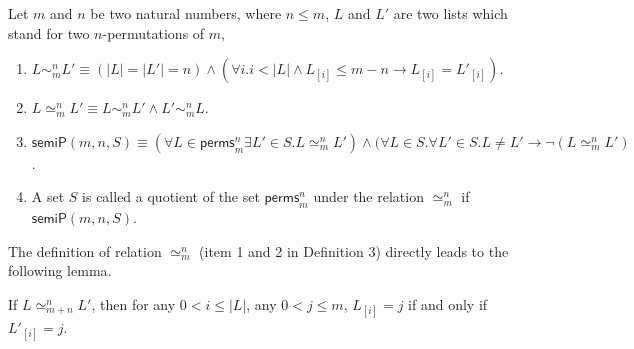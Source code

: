 \documentclass[conference]{IEEEtran}
\newcommand\cai[1]{\textcolor{blue}{ #1} }
\newcommand\caicomment[1]{\textcolor{red}{comment: #1} }
\begin{document}
\begin{definition}
Let $m$ and $n$ be two natural numbers, where $n \le m$,  $L$ and $L'$ are two lists which stand for two  $n$-permutations of $m$,
\begin{enumerate}
\item
$L \sim_m^n L' \equiv (|L| =|L'|=n) \wedge (\forall i. i<|L| \wedge L_{[i]} \le m-n \longrightarrow L_{[i]}=L'_{[i]}) $.

\item $L \simeq_m^n L' \equiv L \sim_m^n L' \wedge   L' \sim_m^n L$.


\item $\mathsf{semiP}(m,n,S)\equiv (\forall  L \in \mathsf{perms}_{m}^{n} \exists  L' \in S. L \simeq_m^n L' ) \wedge (\forall  L\in S. \forall L'\in S. L \neq L' \longrightarrow \neg  (L \simeq_m^n L' )$.

\item    A set $S$ is called a quotient of the set $\mathsf{perms}_{m}^{n}$ under the relation $\simeq_m^n$ if    $\mathsf{semiP}(m,n,S)$.
\end{enumerate}
\end{definition}

The definition of  relation $\simeq_m^n$ (item 1 and 2 in Definition 3) directly leads to the following lemma. %




\begin{lemma}\label{lemma:simeq1}%
If $L \simeq_{m+n}^n L' $, then for any $0<i\le |L|$, any $0<j \le m$, $L_{[i]}=j$ if and only if $L'_{[i]}=j$.
\end{lemma}
\end{document}
